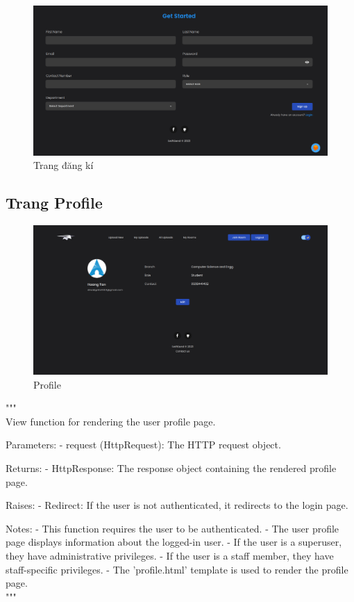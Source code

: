\documentclass[paper=a4wide, fontsize=12pt]{scrartcl}	 %
\begin{document}
\begin{figure}[H]
    \centering
    \includegraphics[scale=0.3]{demo/signup.png}
    \caption{Trang đăng kí}
\end{figure}

\subsection{Trang Profile}
\begin{figure}[H]
    \centering
    \includegraphics[scale=0.3]{demo/profile.png}
    \caption{Profile}
\end{figure}
""" \\
View function for rendering the user profile page.

Parameters:
- request (HttpRequest): The HTTP request object.

Returns:
- HttpResponse: The response object containing the rendered profile page.

Raises:
- Redirect: If the user is not authenticated, it redirects to the login page.

Notes:
- This function requires the user to be authenticated.
- The user profile page displays information about the logged-in user.
- If the user is a superuser, they have administrative privileges.
- If the user is a staff member, they have staff-specific privileges.
- The 'profile.html' template is used to render the profile page. \\
"""
\end{document}
